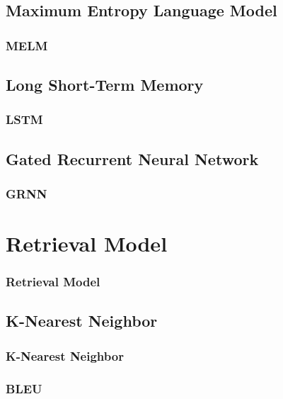 \documentclass[xcolor=dvipsnames]{beamer}
\begin{document}
		\subsection{Maximum Entropy Language Model}
			
			\begin{frame}
				\frametitle{MELM}
				
			\end{frame}
		
		\subsection{Long Short-Term Memory}
			
			\begin{frame}
				\frametitle{LSTM}
				
			\end{frame}
		
		\subsection{Gated Recurrent Neural Network}
			
			\begin{frame}
				\frametitle{GRNN}
				
			\end{frame}
	
	\section{Retrieval Model}
		
		\begin{frame}
			\frametitle{Retrieval Model}
			
		\end{frame}
		
		\subsection{K-Nearest Neighbor}
			
			\begin{frame}
				\frametitle{K-Nearest Neighbor}
				
			\end{frame}
			
			\begin{frame}
				\frametitle{BLEU}
				
			\end{frame}
	
\end{document}
